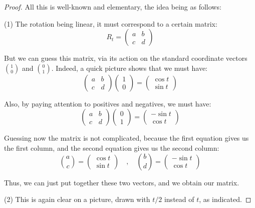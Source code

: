 \documentclass[12pt]{amsbook}
\begin{document}
\begin{proof}
All this is well-known and elementary, the idea being as follows:

\medskip

(1) The rotation being linear, it must correspond to a certain matrix:
$$R_t=\begin{pmatrix}a&b\\ c&d\end{pmatrix}$$

But we can guess this matrix, via its action on the standard coordinate vectors $\binom{1}{0}$ and $\binom{0}{1}$. Indeed, a quick picture shows that we must have:
$$\begin{pmatrix}a&b\\ c&d\end{pmatrix}\begin{pmatrix}1\\ 0\end{pmatrix}=
\begin{pmatrix}\cos t\\ \sin t\end{pmatrix}$$

Also, by paying attention to positives and negatives, we must have:
$$\begin{pmatrix}a&b\\ c&d\end{pmatrix}\begin{pmatrix}0\\ 1\end{pmatrix}=
\begin{pmatrix}-\sin t\\ \cos t\end{pmatrix}$$

Guessing now the matrix is not complicated, because the first equation gives us the first column, and the second equation gives us the second column:
$$\binom{a}{c}=\begin{pmatrix}\cos t\\ \sin t\end{pmatrix}\quad,\quad 
\binom{b}{d}=\begin{pmatrix}-\sin t\\ \cos t\end{pmatrix}$$

Thus, we can just put together these two vectors, and we obtain our matrix.

\medskip

(2) This is again clear on a picture, drawn with $t/2$ instead of $t$, as indicated.


\end{proof}
\end{document}
